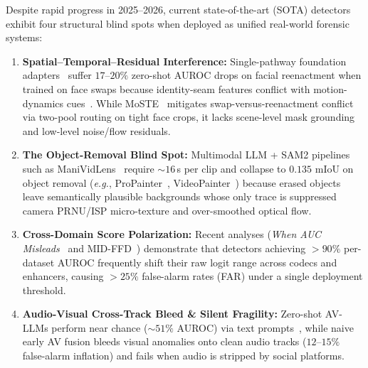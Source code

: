\documentclass[10pt,twocolumn]{article}
\begin{document}
Despite rapid progress in 2025--2026, current state-of-the-art (SOTA) detectors exhibit four structural blind spots when deployed as unified real-world forensic systems:
\begin{enumerate}[leftmargin=1.4em,itemsep=1pt,topsep=2pt]
    \item \textbf{Spatial--Temporal--Residual Interference:} Single-pathway foundation adapters~\cite{ojha2023universalfake,yan2025effort,cui2025forensicsadapter} suffer $17\text{--}20\%$ zero-shot AUROC drops on facial reenactment when trained on face swaps because identity-seam features conflict with motion-dynamics cues~\cite{moste2026}. While MoSTE~\cite{moste2026} mitigates swap-versus-reenactment conflict via two-pool routing on tight face crops, it lacks scene-level mask grounding and low-level noise/flow residuals.
    \item \textbf{The Object-Removal Blind Spot:} Multimodal LLM + SAM2 pipelines such as ManiVidLens~\cite{kang2026manividlens} require ${\sim}16$\,s per clip and collapse to $0.135$ mIoU on object removal (\emph{e.g.}, ProPainter~\cite{zhou2023propainter}, VideoPainter~\cite{bian2025videopainter}) because erased objects leave semantically plausible backgrounds whose only trace is suppressed camera PRNU/ISP micro-texture and over-smoothed optical flow.
    \item \textbf{Cross-Domain Score Polarization:} Recent analyses (\emph{When AUC Misleads}~\cite{nguyen2026whenaucmisleads} and MID-FFD~\cite{cheng2026midffd}) demonstrate that detectors achieving $>90\%$ per-dataset AUROC frequently shift their raw logit range across codecs and enhancers, causing $>25\%$ false-alarm rates (FAR) under a single deployment threshold.
    \item \textbf{Audio-Visual Cross-Track Bleed \& Silent Fragility:} Zero-shot AV-LLMs perform near chance (${\sim}51\%$ AUROC) via text prompts~\cite{huang2026avfable}, while naive early AV fusion bleeds visual anomalies onto clean audio tracks ($12\text{--}15\%$ false-alarm inflation) and fails when audio is stripped by social platforms.
\end{enumerate}
\end{document}
